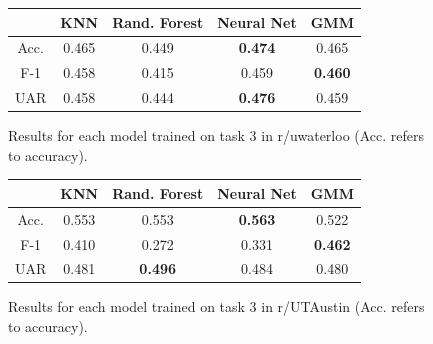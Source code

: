\documentclass[11pt,a4paper]{article}
\begin{document}
    \begin{figure}
        \begin{center}
            \begin{tabular}{ |c|c|c|c|c| }
                \hline
                 & KNN & Rand. Forest & Neural Net & GMM \\
                \hline
                Acc. & 0.465 & 0.449 & \textbf{0.474} & 0.465 \\
                \hline
                F-1 & 0.458 & 0.415 & 0.459 & \textbf{0.460} \\
                \hline
                UAR & 0.458 & 0.444 & \textbf{0.476} & 0.459 \\
                \hline
            \end{tabular}  
        \end{center}

        \caption{Results for each model trained on task 3 in r/uwaterloo (Acc. refers to accuracy).}
    \end{figure}

    \begin{figure}
        \begin{center}
            \begin{tabular}{ |c|c|c|c|c| }
                \hline
                 & KNN & Rand. Forest & Neural Net & GMM \\
                \hline
                Acc. & 0.553 & 0.553 & \textbf{0.563} & 0.522 \\
                \hline
                F-1 & 0.410 & 0.272 & 0.331 & \textbf{0.462} \\
                \hline
                UAR & 0.481 & \textbf{0.496} & 0.484 & 0.480 \\
                \hline
            \end{tabular}  
        \end{center}

        \caption{Results for each model trained on task 3 in r/UTAustin (Acc. refers to accuracy).}
    \end{figure}
\end{document}
